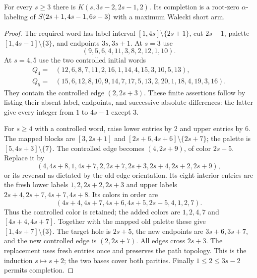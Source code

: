 \begin{lemma}\label{ok:pinned-ap-ray}
For every $s\ge3$ there is $K(s,3s-2,2s-1,2)$.
Its completion is a root-zero $\alpha$-labeling of
$S\!\left(2s+1,4s-1,6s-3\right)$ with a maximum Walecki short arm.
\end{lemma}
\begin{proof}
The required word has label interval $[1,4s]\setminus\{2s+1\}$,
cut $2s-1$, palette $[1,4s-1]\setminus\{3\}$, and endpoints
$3s,3s+1$. At $s=3$ use
\[
 (9,5,6,4,11,3,8,2,12,1,10).
 \]
At $s=4,5$ use the two controlled initial words
\begin{align*}
 Q_4={}&(12,6,8,7,11,2,16,1,14,4,15,3,10,5,13),\\
 Q_5={}&(15,6,12,8,10,9,14,7,17,5,13,2,20,1,18,4,19,3,16).
\end{align*}
They contain the controlled edge $(2,2s+3)$.
These finite assertions follow by listing their absent label, endpoints,
and successive absolute differences: the latter give every integer
from $1$ to $4s-1$ except $3$.

For $s\ge4$ with a controlled word, raise lower entries by $2$
and upper entries by $6$. The mapped blocks are $[3,2s+1]$ and
$[2s+6,4s+6]\setminus\{2s+7\}$; the palette is
$[5,4s+3]\setminus\{7\}$. The controlled edge becomes
$(4,2s+9)$, of color $2s+5$. Replace it by
\[
 (4,4s+8,1,4s+7,2,2s+7,2s+3,2s+4,2s+2,2s+9),
 \]
or its reversal as dictated by the old edge orientation.
Its eight interior entries are the fresh lower labels
$1,2,2s+2,2s+3$ and upper labels
$2s+4,2s+7,4s+7,4s+8$.
Its colors in order are
\[
 (4s+4,4s+7,4s+6,4s+5,2s+5,4,1,2,7).
 \]
Thus the controlled color is retained; the added colors are
$1,2,4,7$ and $[4s+4,4s+7]$.
Together with the mapped old palette these give
$[1,4s+7]\setminus\{3\}$. The target hole is $2s+5$,
the new endpoints are $3s+6,3s+7$, and the new controlled edge
is $(2,2s+7)$. All edges cross $2s+3$.
The replacement uses fresh entries once and preserves the path topology.
This is the induction $s\mapsto s+2$; the two bases cover both
parities. Finally $1\le2\le3s-2$ permits completion.
\end{proof}

